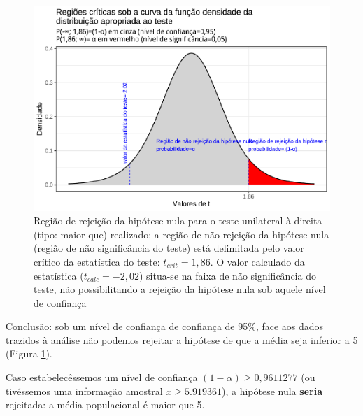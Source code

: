 \documentclass[
]{book}
\begin{document}
\begin{figure}

{\centering \includegraphics[width=1\linewidth]{apostila_files/figure-latex/fig78-1} 

}

\caption{Região de rejeição da hipótese nula para o teste unilateral à direita (tipo: maior que) realizado: a região de não rejeição da hipótese nula (região de não significância do teste) está delimitada pelo valor crítico da estatística do teste: $t_{crit} = 1,86$. O valor calculado da estatística ($t_{calc}=-2,02$) situa-se na faixa de não significância do teste, não possibilitando a rejeição da hipótese nula sob aquele nível de confiança}\label{fig:fig78}
\end{figure}

\hfill\break

Conclusão: sob um nível de confiança de confiança de 95\%, face aos dados trazidos à análise não podemos rejeitar a hipótese de que a média seja inferior a 5 (Figura \ref{fig:fig78}).

\hfill\break

Caso estabelecêssemos um nível de confiança \((1-\alpha) \ge 0,9611277\) (ou tivéssemos uma informação amostral \(\stackrel{-}{x} \ge 5.919361\)), a hipótese nula \textbf{seria} rejeitada: a média populacional é maior que 5.

\hfill\break
\end{document}
